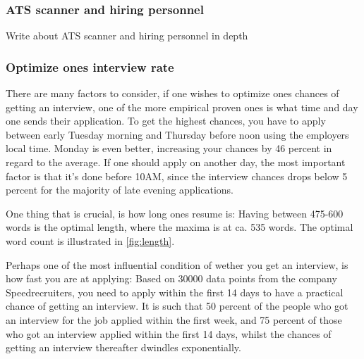 \subsubsection{ATS scanner and hiring personnel}
Write about ATS scanner and hiring personnel in depth

\subsubsection{Optimize ones interview rate}
There are many factors to consider, if one wishes to optimize ones
chances of getting an interview, one of the more empirical proven ones
is what time and day one sends their application.
To get the highest chances, you have to apply between early Tuesday morning
and Thursday before noon using the employers local time. Monday is even better,
increasing your chances by 46 percent in regard to the average.
If one should apply on another day, the most important factor is that
it's done before 10AM, since the interview chances drops below 5 percent for
the majority of late evening applications.\cite{Best_time_and_date}

One thing that is crucial, is how long ones resume is:
Having between 475-600 words is the optimal length, where the maxima is at
ca. 535 words. The optimal word count is illustrated in \vref{fig:length}.

Perhaps one of the most influential condition of wether you get an interview,
is how fast you are at applying:
Based on 30000 data points from the company Speedrecruiters, you need
to apply within the first 14 days to have a practical chance of getting an
interview. It is such that 50 percent of the people who got an interview
for the job applied within the first week, and 75 percent of those who
got an interview applied within the first 14 days, whilst the chances of
getting an interview thereafter dwindles exponentially.\cite{Best_time_and_dateV2}

